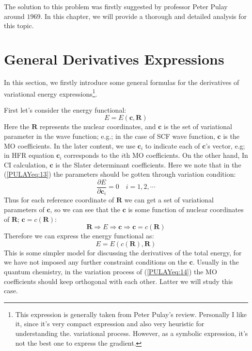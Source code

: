 The solution to this problem was firstly suggested by professor Peter
Pulay around $1969$. In this chapter, we will provide a thorough and
detailed analysis for this topic.

\section{General Derivatives
  Expressions}\label{General_Derivatives_Expressions_hf_derivatives} 
%
%
In this section, we firstly introduce some general formulas for the
derivatives of variational energy expressions\footnote{This expression is
generally taken from Peter Pulay's review. Personally I like it,
since it's very compact expression and also very heuristic for understanding
the. variational process. However, as a symbolic expression, it's not the best
one to express the gradient.}.

First let's consider the energy functional:
\begin{equation}\label{PULAYeq:13}
  E = E(\bm{c},\bm{R})
\end{equation}
Here the $\bm{R}$ represents the nuclear coordinates, and $\bm{c}$ is the set of
variational parameter in the wave function; e.g.; in the case of SCF
wave function, $\bm{c}$ is the MO coefficients. In the later content, we use
$\bm{c}_{i}$ to indicate each of $\bm{c}$'s vector, e.g; in HFR equation
$\bm{c}_{i}$ corresponds to the $i$th MO coefficients. On the other hand,
In CI calculation, $\bm{c}$ is the Slater determinant coefficients. Here we note
that in the (\ref{PULAYeq:13}) the parameters should be gotten through variation
condition:
\begin{equation}\label{PULAYeq:14}
  \frac{\partial E}{\partial \bm{c}_{i}} = 0 \quad i=1,2,\cdots
\end{equation}
Thus for each reference coordinate of $\bm{R}$ we can get a set of
variational parameters of $\bm{c}$, so we can see that the $\bm{c}$ is some
function of nuclear coordinates of $\bm{R}$; $\bm{c} = c(\bm{R})$:
\begin{equation}\label{}
  \bm{R} \Rightarrow E \Rightarrow \bm{c} \Rightarrow \bm{c}= c(\bm{R})
\end{equation}
Therefore we can express the energy functional as:
\begin{equation}\label{PULAYeq:2}
  E = E(c(\bm{R}), \bm{R})
\end{equation}
This is some simpler model for discussing the derivatives of the total
energy, for we have not imposed any further constraint conditions on
the $\bm{c}$. Usually in the quantum chemistry, in the variation process of
(\ref{PULAYeq:14}) the MO coefficients should keep orthogonal with
each other. Latter we will study this case.


